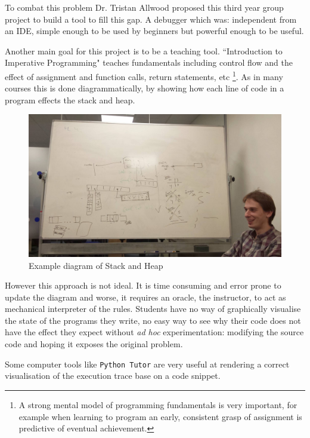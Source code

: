 \documentclass[11pt, a4paper]{article}
\newcommand{\cmd}[1]{{\tt #1}}
\begin{document}
To combat this problem Dr. Tristan Allwood proposed\cite{projectproposal} this third year group project to build a tool to fill this gap.
A debugger which was: independent from an IDE, simple enough to be used by beginners but powerful enough to be useful.

Another main goal for this project is to be a teaching tool.
``Introduction to Imperative Programming" teaches fundamentals including control flow and the effect of assignment and function calls, return statements, etc
\footnote{A strong mental model of programming fundamentals is very important, for example when learning to program an early, consistent grasp of assignment is predictive of eventual achievement\cite{saeed09}.}.
As in many courses this is done diagrammatically, by showing how each line of code in a program effects the stack and heap.

\begin{figure}[h!]
\centering
\includegraphics[width=125mm]{whiteBoardDrawing.jpg}
\caption{Example diagram of Stack and Heap}
\label{fig:boarddiagrams}
\end{figure}

However this approach is not ideal.
It is time consuming and error prone to update the diagram and worse, it requires an oracle, the instructor, to act as mechanical interpreter of the rules.
Students have no way of graphically visualise the state of the programs they write, no easy way to see why their code does not have the effect they expect without \emph{ad hoc} experimentation: modifying the source code and hoping it exposes the original problem.

Some computer tools like \cmd{Python Tutor} \cite{pythontutor} are very useful at rendering a correct visualisation of the execution trace base on a code snippet.
\end{document}
